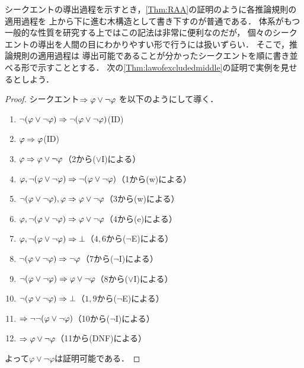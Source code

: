 シークエントの導出過程を示すとき，\cref{Thm:RAA}の証明のように各推論規則の適用過程を
上から下に進む木構造として書き下すのが普通である．
体系がもつ一般的な性質を研究する上ではこの記法は非常に便利なのだが，
個々のシークエントの導出を人間の目にわかりやすい形で行うには扱いずらい．
そこで，推論規則の適用過程は
導出可能であることが分かったシークエントを順に書き並べる形で示すこととする．
次の\cref{Thm:lawofexcludedmiddle}の証明で実例を見せるとしよう．


\begin{proof}
	シークエント\(\Rightarrow \varphi \lor \lnot \varphi\)
	を以下のようにして導く．
	\begin{enumerate}
		\item \(\lnot \paren{\varphi \lor \lnot \varphi} \sequent \lnot \paren{\varphi \lor \lnot \varphi}\)\quad (ID)
		\item \(\varphi \Rightarrow \varphi\)\quad (ID)
		\item \(\varphi \Rightarrow \varphi \lor \lnot \varphi\)\quad （2から(\(\lor\)I)による）
		\item \(\varphi, \lnot \paren{\varphi \lor \lnot \varphi} \sequent \lnot \paren{\varphi \lor \lnot \varphi}\)\quad （1から(w)による）
		\item \(\lnot \paren{\varphi \lor \lnot \varphi}, \varphi \sequent \varphi \lor \lnot \varphi\)\quad （3から(w)による）
		\item \(\varphi,\lnot \paren{\varphi \lor \lnot \varphi} \sequent \varphi \lor \lnot \varphi\)\quad （4から(e)による）
		\item \(\varphi, \lnot \paren{\varphi \lor \lnot \varphi} \sequent \bot\)\quad （\(4,6\)から(\(\lnot\)E)による）
		\item \(\lnot \paren{\varphi \lor \lnot \varphi} \sequent \lnot \varphi\)\quad （7から(\(\lnot\)I)による）
		\item \(\lnot \paren{\varphi \lor \lnot \varphi} \sequent \varphi \lor \lnot \varphi\)\quad （8から(\(\lor\)I)による）
		\item \(\lnot \paren{\varphi \lor \lnot \varphi} \sequent \bot\)\quad （\(1,9\)から(\(\lnot\)E)による）
		\item \(\sequent \lnot \lnot \paren{\varphi \lor \lnot \varphi}\)\quad （10から(\(\lnot\)I)による）
		\item \(\Rightarrow \varphi \lor \lnot \varphi\)\quad （11から(DNF)による）
	\end{enumerate}
	よって\(\varphi \lor \lnot \varphi\)は証明可能である．
\end{proof}

